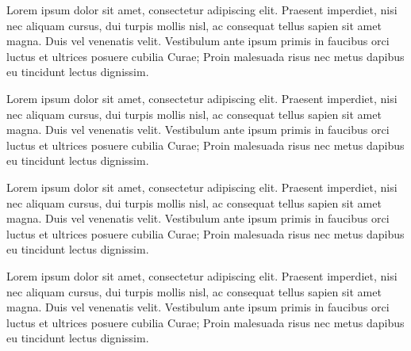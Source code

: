 Lorem ipsum dolor sit amet, consectetur adipiscing elit. Praesent imperdiet, nisi 
nec aliquam cursus, dui turpis mollis nisl, ac consequat tellus sapien sit amet 
magna. Duis vel venenatis velit. Vestibulum ante ipsum primis in faucibus orci 
luctus et ultrices posuere cubilia Curae; Proin malesuada risus nec metus dapibus 
eu tincidunt lectus dignissim. 

Lorem ipsum dolor sit amet, consectetur adipiscing elit. Praesent imperdiet, nisi 
nec aliquam cursus, dui turpis mollis nisl, ac consequat tellus sapien sit amet 
magna. Duis vel venenatis velit. Vestibulum ante ipsum primis in faucibus orci 
luctus et ultrices posuere cubilia Curae; Proin malesuada risus nec metus dapibus 
eu tincidunt lectus dignissim. 

Lorem ipsum dolor sit amet, consectetur adipiscing elit. Praesent imperdiet, nisi 
nec aliquam cursus, dui turpis mollis nisl, ac consequat tellus sapien sit amet 
magna. Duis vel venenatis velit. Vestibulum ante ipsum primis in faucibus orci 
luctus et ultrices posuere cubilia Curae; Proin malesuada risus nec metus dapibus 
eu tincidunt lectus dignissim. 

Lorem ipsum dolor sit amet, consectetur adipiscing elit. Praesent imperdiet, nisi 
nec aliquam cursus, dui turpis mollis nisl, ac consequat tellus sapien sit amet 
magna. Duis vel venenatis velit. Vestibulum ante ipsum primis in faucibus orci 
luctus et ultrices posuere cubilia Curae; Proin malesuada risus nec metus dapibus 
eu tincidunt lectus dignissim. 
